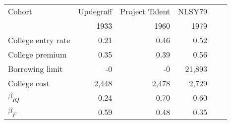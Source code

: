 \begin{tabular}{lrrrrr}
\hline
Cohort & Updegraff  & Project Talent  & NLSY79  &   &   \\ 
  & 1933  & 1960  & 1979  &   &   \\ 
\hline
College entry rate & 0.21  & 0.46  & 0.52  &   &   \\ 
College premium & 0.35  & 0.39  & 0.56  &   &   \\ 
Borrowing limit & -0  & -0  & 21,893  &   &   \\ 
College cost & 2,448  & 2,478  & 2,729  &   &   \\ 
\hline
$\beta_{IQ}$ & 0.24  & 0.70  & 0.60  &   &   \\ 
$\beta_{F}$ & 0.59  & 0.48  & 0.35  &   &   \\ 
\hline
\end{tabular}%
